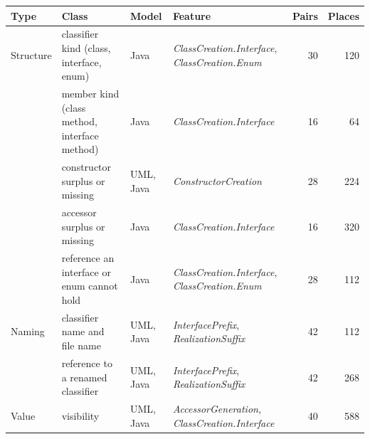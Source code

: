 \begin{table}
    \centering
    \begin{tabularx}{0.95\textheight}{|l|>{\raggedright\arraybackslash}X|l|>{\raggedright\arraybackslash}X|r|r|}
        \hline
        \textbf{Type} & \textbf{Class}                               & \textbf{Model} & \textbf{Feature}                                                                          & \textbf{Pairs} & \textbf{Places} \\
        \hline
        Structure     & classifier kind (class, interface, enum)     & Java           & \textit{ClassCreation.Interface}, \textit{ClassCreation.Enum}                             & 30             & 120             \\
        \hline
                      & member kind (class method, interface method) & Java           & \textit{ClassCreation.Interface}                                                          & 16             & 64              \\
        \hline
                      & constructor surplus or missing               & UML, Java      & \textit{ConstructorCreation}                                                              & 28             & 224             \\
        \hline
                      & accessor surplus or missing                  & Java           & \textit{ClassCreation.Interface}                                                          & 16             & 320             \\
        \hline
                      & reference an interface or enum cannot hold   & Java           & \textit{ClassCreation.Interface}, \textit{ClassCreation.Enum}                             & 28             & 112             \\
        \hline
        Naming        & classifier name and file name                & UML, Java      & \textit{InterfacePrefix}, \textit{RealizationSuffix}                                      & 42             & 112             \\
        \hline
                      & reference to a renamed classifier            & UML, Java      & \textit{InterfacePrefix}, \textit{RealizationSuffix}                                      & 42             & 268             \\
        \hline
        Value         & visibility                                   & UML, Java      & \textit{AccessorGeneration}, \textit{ClassCreation.Interface}                             & 40             & 588             \\

\end{tabularx}
\end{table}
